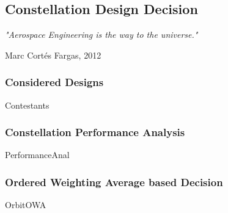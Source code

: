 \subsection{Constellation Design Decision}

\epigraph{\textit{"Aerospace Engineering is the way to the universe."}}{Marc Cortés Fargas, 2012} 

\subsubsection{Considered Designs}
{Contestants}

\subsubsection{Constellation Performance Analysis}
{PerformanceAnal}

\subsubsection{Ordered Weighting Average based Decision}
{OrbitOWA}

